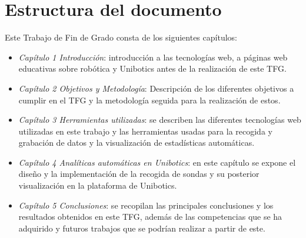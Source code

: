 \section{Estructura del documento}

Este Trabajo de Fin de Grado consta de los siguientes capítulos:

\begin{itemize}
    \item \textit{Capítulo 1 Introducción}: introducción a las tecnologías web, a páginas web educativas sobre robótica y Unibotics antes de la realización de este TFG.
    \item \textit{Capítulo 2 Objetivos y Metodología}: Descripción de los diferentes objetivos a cumplir en el TFG y la metodología seguida para la realización de estos.
    \item \textit{Capítulo 3 Herramientas utilizadas}: se describen las diferentes tecnologías web utilizadas en este trabajo y las herramientas usadas para la recogida y grabación de datos y la visualización de estadísticas automáticas.
   \item \textit{Capítulo 4 Analíticas automáticas en Unibotics}: en este capítulo se expone el diseño y la implementación de la recogida de sondas y su posterior visualización en la plataforma de Unibotics.
  \item \textit{Capítulo 5 Conclusiones}: se recopilan las principales conclusiones y los resultados obtenidos en este TFG, además de las competencias que se ha adquirido y futuros trabajos que se podrían realizar a partir de este.
   \end{itemize}